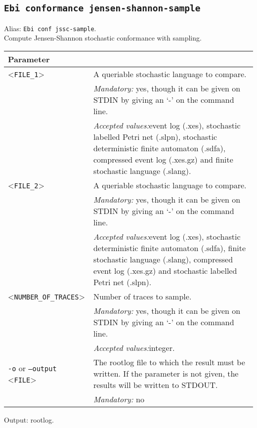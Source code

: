 {\subsection{\texttt{Ebi conformance jensen-shannon-sample}}
\label{command:Ebi conformance jensen-shannon-sample}
Alias: \texttt{Ebi conf jssc-sample}.\\
Compute Jensen-Shannon stochastic conformance with sampling.\\
\begin{tabularx}{\linewidth}{lX}
\toprule
Parameter \\\midrule
<\texttt{FILE\_1}>&A queriable stochastic language to compare.\\
&\textit{Mandatory:} \quad yes, though it can be given on STDIN by giving an `-' on the command line.\\
&\textit{Accepted values:}\quad event log (.xes), stochastic labelled Petri net (.slpn), stochastic deterministic finite automaton (.sdfa), compressed event log (.xes.gz) and finite stochastic language (.slang).\\
<\texttt{FILE\_2}>&A queriable stochastic language to compare.\\
&\textit{Mandatory:} \quad yes, though it can be given on STDIN by giving an `-' on the command line.\\
&\textit{Accepted values:}\quad event log (.xes), stochastic deterministic finite automaton (.sdfa), finite stochastic language (.slang), compressed event log (.xes.gz) and stochastic labelled Petri net (.slpn).\\
<\texttt{NUMBER\_OF\_TRACES}>&Number of traces to sample.\\
&\textit{Mandatory:} \quad yes, though it can be given on STDIN by giving an `-' on the command line.\\
&\textit{Accepted values:}\quad integer.\\
\texttt{-o} or \texttt{--output} <\texttt{FILE}> &
The rootlog file to which the result must be written. If the parameter is not given, the results will be written to STDOUT.\\
&\textit{Mandatory:} \quad no\\
\bottomrule
\end{tabularx}
Output: rootlog.
}
